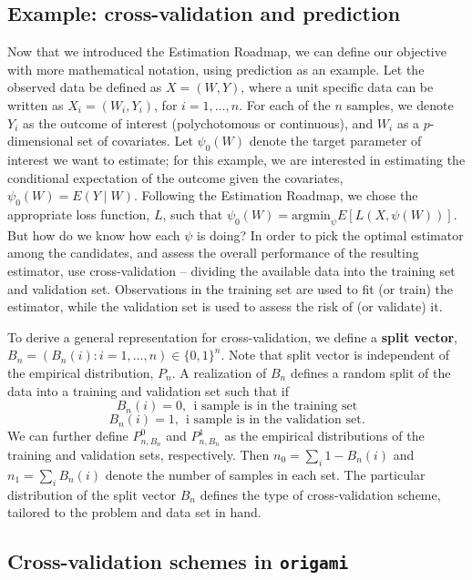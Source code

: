 \documentclass[12pt, krantz2,]{krantz}
\theoremstyle{definition}
\theoremstyle{definition}
\theoremstyle{definition}
\newcommand{\1}{\mathbbm{1}}
\begin{document}
\hypertarget{example-cross-validation-and-prediction}{%
\subsection{Example: cross-validation and prediction}\label{example-cross-validation-and-prediction}}

Now that we introduced the Estimation Roadmap, we can define our objective with
more mathematical notation, using prediction as an example. Let the observed
data be defined as \(X = (W,Y)\), where a unit specific data can be written as
\(X_i = (W_i,Y_i)\), for \(i = 1, \ldots, n\). For each of the \(n\) samples, we
denote \(Y_i\) as the outcome of interest (polychotomous or continuous), and \(W_i\)
as a \(p\)-dimensional set of covariates. Let \(\psi_0(W)\) denote the target
parameter of interest we want to estimate; for this example, we are interested
in estimating the conditional expectation of the outcome given the covariates,
\(\psi_0(W) = E(Y \mid W)\). Following the Estimation Roadmap, we chose the
appropriate loss function, \(L\), such that \(\psi_0(W) = \text{argmin}_{\psi} E[L(X,\psi(W))]\). But how do we know how each \(\psi\) is doing? In order to pick
the optimal estimator among the candidates, and assess the overall performance
of the resulting estimator, use cross-validation -- dividing the available data
into the training set and validation set. Observations in the training set are
used to fit (or train) the estimator, while the validation set is used to assess
the risk of (or validate) it.

To derive a general representation for cross-validation, we define a \textbf{split
vector}, \(B_n = (B_n(i): i = 1, \ldots, n) \in \{0,1\}^n\). Note that split
vector is independent of the empirical distribution, \(P_n\). A realization of
\(B_n\) defines a random split of the data into a training and validation set such
that if
\[B_n(i) = 0, \ \ \text{i sample is in the training set}\]
\[B_n(i) = 1, \ \ \text{i sample is in the validation set.}\]
We can further define \(P_{n,B_n}^0\) and \(P_{n,B_n}^1\) as the empirical
distributions of the training and validation sets, respectively. Then \(n_0 = \sum_i 1-B_n(i)\) and \(n_1 = \sum_i B_n(i)\) denote the number of samples in each
set. The particular distribution of the split vector \(B_n\) defines the type of
cross-validation scheme, tailored to the problem and data set in hand.

\hypertarget{cross-validation-schemes-in-origami}{%
\subsection{\texorpdfstring{Cross-validation schemes in \texttt{origami}}{Cross-validation schemes in origami}}\label{cross-validation-schemes-in-origami}}
\end{document}
